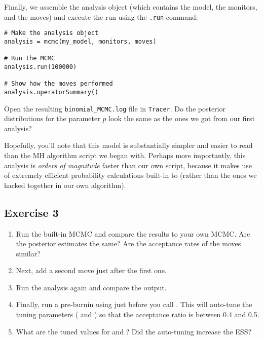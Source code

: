 Finally, we assemble the analysis object (which contains the model, the monitors, and the moves) and execute the run using the \texttt{.run} command:
{\tt \begin{snugshade*}
\begin{lstlisting}    
# Make the analysis object
analysis = mcmc(my_model, monitors, moves)

# Run the MCMC
analysis.run(100000)

# Show how the moves performed
analysis.operatorSummary()
\end{lstlisting}
\end{snugshade*}}
\impmark Open the resulting \texttt{binomial\_MCMC.log} file in \texttt{Tracer}.
Do the posterior distributions for the parameter $p$ look the same as the ones we got from our first analysis?

Hopefully, you'll note that this \Rev model is substantially simpler and easier to read than the MH algorithm script we began with.
Perhaps more importantly, this \Rev analysis is \emph{orders of magnitude} faster than our own script, because it makes use of extremely efficient probability calculations built-in to \RevBayes (rather than the ones we hacked together in our own algorithm).

\subsection{Exercise 3}

\begin{enumerate}[label=\textnormal{Step \arabic*)}]
	\item Run the built-in MCMC and compare the results to your own MCMC. Are the posterior estimates the same? Are the acceptance rates of the moves similar?
	\item Next, add a second move  just after the first one.
	\item Run the analysis again and compare the output.
	\item Finally, run a pre-burnin using  just before you call . This will auto-tune the tuning parameters (\EG {} and ) so that the acceptance ratio is between 0.4 and 0.5.
	\item What are the tuned values for  and ? Did the auto-tuning increase the ESS?
\end{enumerate}

